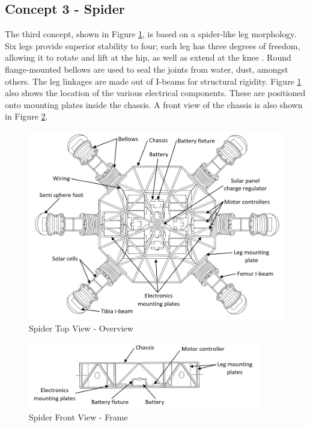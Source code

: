 \subsection{Concept 3 - Spider}

The third concept, shown in Figure \ref{fig:spider_over}, is based on a spider-like leg morphology. Six legs provide superior stability to four; each leg has three degrees of freedom, allowing it to rotate and lift at the hip, as well as extend at the knee \cite{robot_platform_robot_nodate}. Round flange-mounted bellows are used to seal the joints from water, dust, amongst others. The leg linkages are made out of I-beams for structural rigidity.
Figure \ref{fig:spider_over} also shows the location of the various electrical components. These are positioned onto mounting plates inside the chassis. A front view of the chassis is also shown in Figure \ref{fig:spider_frame_front}.

\begin{figure}[H]
    \centering
    \includegraphics[width=\textwidth]{3_DesignConcepts/img/C3/overview_ann.PNG}
    \caption{Spider Top View - Overview}
    \label{fig:spider_over}
\end{figure}


\begin{figure}[H]
    \centering
    \includegraphics[width=0.9\textwidth]{3_DesignConcepts/img/C3/framefront_ann.PNG}
    \caption{Spider Front View - Frame}
    \label{fig:spider_frame_front}
\end{figure}

